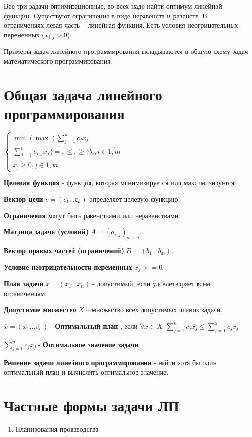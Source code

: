 \documentclass[11pt]{article}
\theoremstyle{break}
\begin{document}
\begin{sloppypar}
  Все три задачи оптимизационные, во всех надо найти оптимум линейной функции. Существуют ограничения в виде неравенств и равенств. В ограничениях левая часть – линейная функция. Есть условия неотрицательных переменных ($x_{i, j} > 0$)
  
  Примеры задач линейного программирования вкладываются в общую схему задач математического программирования.
  
  \section*{Общая задача линейного программирования}
  $\begin{cases}
    \min(\max) \sum_{j = 1}^n c_j x_j \\
    \sum_{j = 1}^n a_{i, j} x_j \{=, \leq, \geq\} b_i, i \in \overline{1, m} \\
    x_j \geq 0, j \in \overline{1, m}
  \end{cases}$
  
  \textbf{Целевая функция} - функция, которая минимизируется или максимизируется.
  
  \textbf{Вектор цели} $c = (c_1 \dots с_n)$ определяет целевую функцию.
  
  \textbf{Ограничения} могут быть равенствами или неравенствами.
  
  
  \textbf{Матрица задачи (условий)} $A = (a_{i, j})_{m \times n}$.
  	
  \textbf{Вектор правых частей (ограничений)} $B = (b_1 \dots b_m)$.
  
  \textbf{Условие неотрицательности переменных} $x_j >= 0$.

  \textbf{План задачи} $x = (x_1 \dots x_n)$ - допустимый, если удовлетворяет всем ограничениям.
  
  \textbf{Допустимое множество} $X$ – множество всех допустимых планов задачи.

  $\overline{x} = (\overline{x_1} \dots \overline{x_n})$ - \textbf{Оптимальный план} , если $\forall x \in X: \sum_{j = 1}^n c_j \overline{x_j} \leq \sum_{j = 1}^n c_j x_j$

$\sum_{j = 1}^n c_j \overline{x_j}$ - \textbf{Оптимальное значение задачи}

\textbf{Решение задачи линейного программирования} - найти хотя бы один оптимальный план и вычислить оптимальное значение.

\section*{Частные формы задачи ЛП}
\begin{enumerate}
  \item Планирования производства
  

\end{enumerate}
\end{sloppypar}
\end{document}
